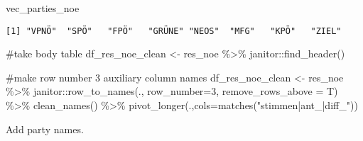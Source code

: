 \documentclass[
  letterpaper,
  DIV=11,
  numbers=noendperiod,
  oneside]{scrartcl}
\newenvironment{Shaded}{\begin{snugshade}}{\end{snugshade}}
\newcommand{\AttributeTok}[1]{\textcolor[rgb]{0.40,0.45,0.13}{#1}}
\newcommand{\CommentTok}[1]{\textcolor[rgb]{0.37,0.37,0.37}{#1}}
\newcommand{\DecValTok}[1]{\textcolor[rgb]{0.68,0.00,0.00}{#1}}
\newcommand{\FunctionTok}[1]{\textcolor[rgb]{0.28,0.35,0.67}{#1}}
\newcommand{\NormalTok}[1]{\textcolor[rgb]{0.00,0.23,0.31}{#1}}
\newcommand{\OtherTok}[1]{\textcolor[rgb]{0.00,0.23,0.31}{#1}}
\newcommand{\SpecialCharTok}[1]{\textcolor[rgb]{0.37,0.37,0.37}{#1}}
\newcommand{\StringTok}[1]{\textcolor[rgb]{0.13,0.47,0.30}{#1}}
\begin{document}
\begin{Shaded}
\begin{Highlighting}[]
\NormalTok{vec\_parties\_noe}
\end{Highlighting}
\end{Shaded}

\begin{verbatim}
[1] "VPNÖ"  "SPÖ"   "FPÖ"   "GRÜNE" "NEOS"  "MFG"   "KPÖ"   "ZIEL" 
\end{verbatim}

\begin{Shaded}
\begin{Highlighting}[]
\CommentTok{\#take body table}
\NormalTok{df\_res\_noe\_clean }\OtherTok{\textless{}{-}}\NormalTok{ res\_noe }\SpecialCharTok{\%\textgreater{}\%} 
\NormalTok{  janitor}\SpecialCharTok{::}\FunctionTok{find\_header}\NormalTok{()}

\CommentTok{\#make row number 3 auxiliary column names}
\NormalTok{df\_res\_noe\_clean }\OtherTok{\textless{}{-}}\NormalTok{ res\_noe }\SpecialCharTok{\%\textgreater{}\%} 
\NormalTok{  janitor}\SpecialCharTok{::}\FunctionTok{row\_to\_names}\NormalTok{(., }\AttributeTok{row\_number=}\DecValTok{3}\NormalTok{, }\AttributeTok{remove\_rows\_above =}\NormalTok{ T) }\SpecialCharTok{\%\textgreater{}\%} 
  \FunctionTok{clean\_names}\NormalTok{() }\SpecialCharTok{\%\textgreater{}\%} 
  \FunctionTok{pivot\_longer}\NormalTok{(.,}\AttributeTok{cols=}\FunctionTok{matches}\NormalTok{(}\StringTok{"stimmen|ant\_|diff\_"}\NormalTok{))}
\end{Highlighting}
\end{Shaded}

Add party names.
\end{document}
